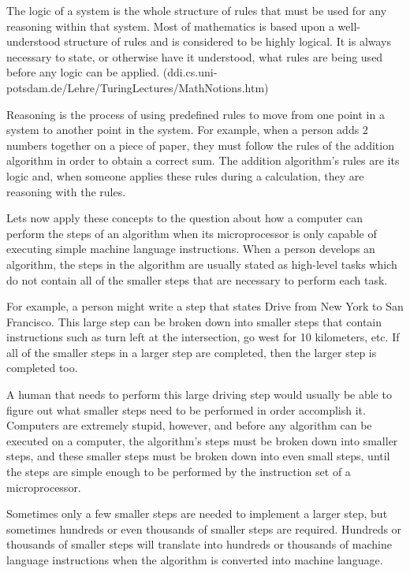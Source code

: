 \documentclass[12pt,oneside]{book}
\begin{document}
The logic of a system is the whole structure of rules that must be used for any reasoning within that system. Most of mathematics is based upon a well{}-understood structure of rules and is considered to be highly logical. It is always necessary to state, or otherwise have it understood, what rules are being used before any logic can be applied.
(ddi.cs.uni{}-potsdam.de/Lehre/TuringLectures/MathNotions.htm)


Reasoning is the process of using predefined rules to move from one point in a system to another point in the system. For example, when a person adds 2 numbers together on a piece of paper, they must follow the rules of the addition algorithm in order to obtain a correct sum. The addition algorithm's rules are its logic and, when someone applies these rules during a calculation, they are reasoning with the rules. 

Lets now apply these concepts to the question about how a computer can perform the steps of an algorithm when its microprocessor is only capable of executing simple machine language instructions. When a person develops an algorithm, the steps in the algorithm are usually stated as high{}-level tasks which do not contain all of the smaller steps that are necessary to perform each task. 

For example, a person might write a step that states {\textquotedbl}Drive from New York to San Francisco.{\textquotedbl} This large step can be broken down into smaller steps that contain instructions such as {\textquotedbl}turn left at the intersection, go west for 10 kilometers, etc.{\textquotedbl} If all of the smaller steps in a larger step are completed, then the larger step is completed too. 

A human that needs to perform this large driving step would usually be able to figure out what smaller steps need to be performed in order accomplish it. Computers are extremely stupid, however, and before any algorithm can be executed on a computer, the algorithm's steps must be broken down into smaller steps, and these smaller steps must be broken down into even small steps, until the steps are simple enough to be performed by the instruction set of a microprocessor. 

Sometimes only a few smaller steps are needed to implement a larger step, but sometimes hundreds or even thousands of smaller steps are required. Hundreds or thousands of smaller steps will translate into hundreds or thousands of machine language instructions when the algorithm is converted into machine language. 
\end{document}
